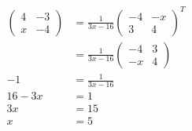 \documentclass{article}
\begin{document}
\begin{align*}
  \begin{pmatrix}
    4 & -3 \\
    x & -4
  \end{pmatrix} & = \frac{1}{3 x - 16} \begin{pmatrix}
                                         -4 & -x \\
                                         3  & 4
                                       \end{pmatrix}^T  \\
                  & = \frac{1}{3 x - 16} \begin{pmatrix}
                                           -4 & 3 \\
                                           -x & 4
                                         \end{pmatrix} \\
  -1              & = \frac{1}{3 x - 16}                \\
  16 - 3 x        & = 1                                 \\
  3 x             & = 15                                \\
  x               & = 5
\end{align*}

\setcounter{subsubsection}{44}
\subsubsection{}
\end{document}
